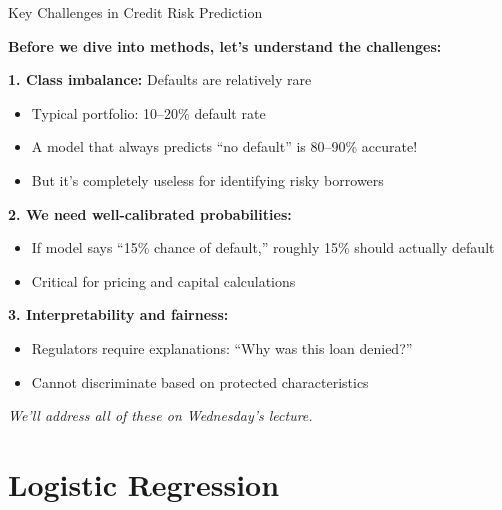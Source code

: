 \documentclass[10pt]{beamer}
\begin{document}
\begin{frame}{Key Challenges in Credit Risk Prediction}

  \textbf{Before we dive into methods, let's understand the challenges:}

  \vspace{1em}
  \textbf{1. Class imbalance:} Defaults are relatively rare
  \begin{itemize}
    \item Typical portfolio: 10--20\% default rate
    \item A model that always predicts ``no default'' is 80--90\% accurate!
    \item But it's completely useless for identifying risky borrowers
  \end{itemize}

  \vspace{0.5em}
  \textbf{2. We need well-calibrated probabilities:}
  \begin{itemize}
    \item If model says ``15\% chance of default,'' roughly 15\% should actually default
    \item Critical for pricing and capital calculations
  \end{itemize}

  \vspace{0.5em}
  \textbf{3. Interpretability and fairness:}
  \begin{itemize}
    \item Regulators require explanations: ``Why was this loan denied?''
    \item Cannot discriminate based on protected characteristics
  \end{itemize}

  \vspace{0.5em}
  \textit{We'll address all of these on Wednesday's lecture.}
\end{frame}

\section{Logistic Regression}
\end{document}
